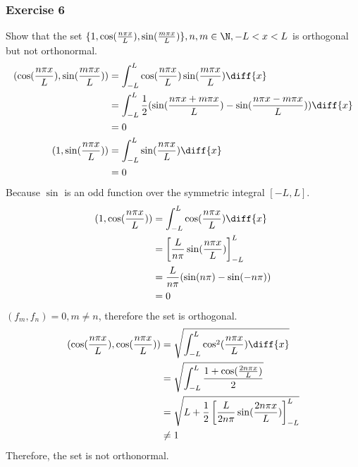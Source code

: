\documentclass{math}
\begin{document}
\subsubsection*{Exercise 6}
Show that the set \( \{1,\cos(\frac{n\pi x}{L}), \sin(\frac{m\pi x}{L})\},
n,m\in\N, -L<x<L \) is orthogonal but not orthonormal.
\begin{align*}
  (\cos(\frac{n\pi x}{L}),\sin(\frac{m\pi x}{L})) &=
    \int_{-L}^{L}\cos(\frac{n\pi x}{L})\sin(\frac{m\pi x}{L})\diff{x} \\
  &= \int_{-L}^{L}\frac{1}{2}(\sin(\frac{n\pi x+m\pi x}{L})-
    \sin(\frac{n\pi x-m\pi x}{L}))\diff{x} \\
  &= 0 \\
  (1,\sin(\frac{n\pi x}{L})) &= \int_{-L}^{L}\sin(\frac{n\pi x}{L})\diff{x} \\
  &= 0
\end{align*}
Because \( \sin \) is an odd function over the symmetric integral \( [-L,L] \).
\begin{align*}
  (1,\cos(\frac{n\pi x}{L})) &= \int_{-L}^{L}\cos(\frac{n\pi x}{L})\diff{x} \\
  &= \left[\frac{L}{n\pi}\sin(\frac{n\pi x}{L})\right]_{-L}^{L} \\
  &= \frac{L}{n\pi}(\sin(n\pi)-\sin(-n\pi)) \\
  &= 0
\end{align*}
\( (f_m,f_n) = 0, m\ne n \), therefore the set is orthogonal.
\begin{align*}
  (\cos(\frac{n\pi x}{L}),\cos(\frac{n\pi x}{L})) &=
    \sqrt{\int_{-L}^{L}\cos^2(\frac{n\pi x}{L})\diff{x}} \\
  &= \sqrt{\int_{-L}^{L}\frac{1+\cos(\frac{2n\pi x}{L})}{2}} \\
  &= \sqrt{L+\frac{1}{2}
    \left[\frac{L}{2n\pi}\sin(\frac{2n\pi x}{L})\right]_{-L}^{L}} \\
  &\ne 1
\end{align*}
Therefore, the set is not orthonormal.
\end{document}
